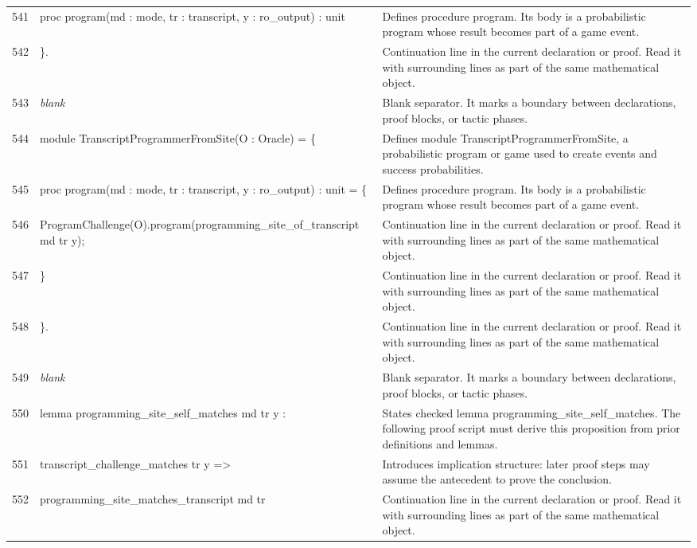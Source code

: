 \documentclass[10pt]{article}
\begin{document}
\begin{longtable}{r L{0.53\textwidth} L{0.37\textwidth}}
541 & {\ttfamily\scriptsize   proc program(md : mode, tr : transcript, y : ro\_output) : unit} & Defines procedure program.  Its body is a probabilistic program whose result becomes part of a game event. \\
542 & {\ttfamily\scriptsize \}.} & Continuation line in the current declaration or proof.  Read it with surrounding lines as part of the same mathematical object. \\
543 & {\ttfamily\scriptsize \emph{blank}} & Blank separator.  It marks a boundary between declarations, proof blocks, or tactic phases. \\
544 & {\ttfamily\scriptsize module TranscriptProgrammerFromSite(O : Oracle) = \{} & Defines module TranscriptProgrammerFromSite, a probabilistic program or game used to create events and success probabilities. \\
545 & {\ttfamily\scriptsize   proc program(md : mode, tr : transcript, y : ro\_output) : unit = \{} & Defines procedure program.  Its body is a probabilistic program whose result becomes part of a game event. \\
546 & {\ttfamily\scriptsize     ProgramChallenge(O).program(programming\_site\_of\_transcript md tr y);} & Continuation line in the current declaration or proof.  Read it with surrounding lines as part of the same mathematical object. \\
547 & {\ttfamily\scriptsize   \}} & Continuation line in the current declaration or proof.  Read it with surrounding lines as part of the same mathematical object. \\
548 & {\ttfamily\scriptsize \}.} & Continuation line in the current declaration or proof.  Read it with surrounding lines as part of the same mathematical object. \\
549 & {\ttfamily\scriptsize \emph{blank}} & Blank separator.  It marks a boundary between declarations, proof blocks, or tactic phases. \\
550 & {\ttfamily\scriptsize lemma programming\_site\_self\_matches md tr y :} & States checked lemma programming\_site\_self\_matches.  The following proof script must derive this proposition from prior definitions and lemmas. \\
551 & {\ttfamily\scriptsize   transcript\_challenge\_matches tr y =>} & Introduces implication structure: later proof steps may assume the antecedent to prove the conclusion. \\
552 & {\ttfamily\scriptsize   programming\_site\_matches\_transcript md tr} & Continuation line in the current declaration or proof.  Read it with surrounding lines as part of the same mathematical object. \\

\end{longtable}
\end{document}
